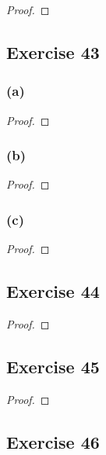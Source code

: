 \documentclass[14pt]{extarticle}
\begin{document}
\begin{proof}

\end{proof}

\subsection{Exercise 43}

\subsubsection{(a)}

\begin{proof}

\end{proof}

\subsubsection{(b)}

\begin{proof}

\end{proof}

\subsubsection{(c)}

\begin{proof}

\end{proof}

\subsection{Exercise 44}

\begin{proof}

\end{proof}

\subsection{Exercise 45}

\begin{proof}

\end{proof}

\subsection{Exercise 46}
\end{document}
